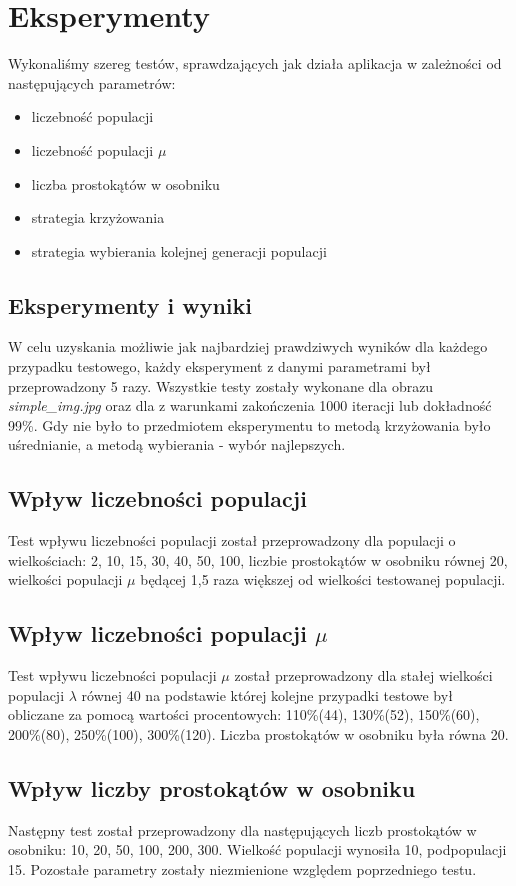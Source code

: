 \section{Eksperymenty}
Wykonaliśmy szereg testów, sprawdzających jak działa aplikacja w zależności od następujących parametrów:
\begin{itemize}
    \item liczebność populacji
    \item liczebność populacji $\mu$
    \item liczba prostokątów w osobniku
    \item strategia krzyżowania
    \item strategia wybierania kolejnej generacji populacji
\end{itemize}

\subsection{Eksperymenty i wyniki}
W celu uzyskania możliwie jak najbardziej prawdziwych wyników dla każdego przypadku testowego, każdy eksperyment z danymi parametrami był przeprowadzony 5 razy. Wszystkie testy zostały wykonane dla obrazu {\it simple\_img.jpg} oraz dla z warunkami zakończenia 1000 iteracji lub dokładność 99\%. Gdy nie było to przedmiotem eksperymentu to metodą krzyżowania było uśrednianie, a metodą wybierania - wybór najlepszych.

\subsection*{Wpływ liczebności populacji}
Test wpływu liczebności populacji został przeprowadzony dla populacji o wielkościach: 2, 10, 15, 30, 40, 50, 100, liczbie prostokątów w osobniku równej 20, wielkości populacji $\mu$ będącej 1,5 raza większej od wielkości testowanej populacji.

\subsection*{Wpływ liczebności populacji $\mu$}
Test wpływu liczebności populacji $\mu$ został przeprowadzony dla stałej wielkości populacji $\lambda$ równej 40 na podstawie której kolejne przypadki testowe był obliczane za pomocą wartości procentowych: 110\%(44), 130\%(52),
150\%(60), 200\%(80), 250\%(100), 300\%(120). Liczba prostokątów w osobniku była równa 20.

\subsection*{Wpływ liczby prostokątów w osobniku}
Następny test został przeprowadzony dla następujących liczb prostokątów w osobniku: 10, 20, 50, 100, 200, 300. Wielkość populacji wynosiła 10, podpopulacji 15. Pozostałe parametry zostały niezmienione względem poprzedniego testu. 

